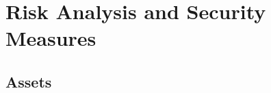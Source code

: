 \documentclass{article}
\begin{document}
\begin{comment}
\subsection{Backdoors}

\paragraph{Easy backdoor}
On port 5555 we have an echo server that will return the input.
If the input string is longer than 50 characters it will open a terminal as the root user.

\begin{enumerate}
	\item Run nmap to discover the echo service running on port 5555
	\item Run the following command from a terminal to connect: \texttt{nc <ip address> <port>}
\end{enumerate}

\paragraph{Difficult backdoor}
The file index.php sends a cookie to the browser containing the credentials of the root user encrypted using Caesar cipher.

\begin{enumerate}
	\item Navigate to the main page in a browser e.g. Google Chrome
	\item Press F12 to bring up the developer tools
	\item Navigate to Resources -- Cookies -- localhost
	\item The name of the cookie is the password of the root user, encrypted using Caesar cypher +10.
	\item Decrypt the password by replacing each letter with the one appearing 10 characters earlier in the English alphabet (all caps).
	\item Use the recovered password to log in to Ubuntu.
\end{enumerate}
\end{comment}

\section{Risk Analysis and Security Measures}

\subsection{Assets}
\end{document}
